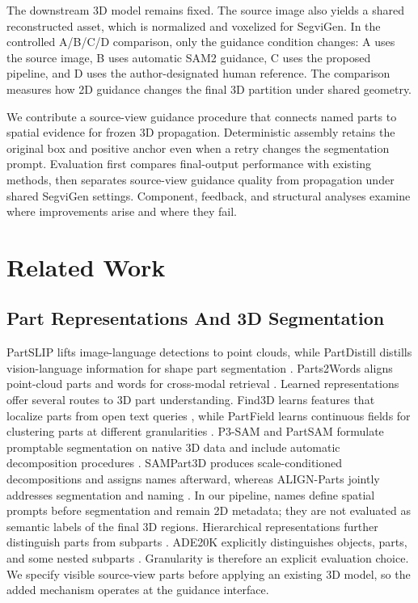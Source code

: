 \documentclass[pdflatex,iicol,sn-apa]{sn-jnl}
\begin{document}
The downstream 3D model remains fixed. The source image also yields a shared reconstructed asset, which is normalized and voxelized for SegviGen. In the controlled A/B/C/D comparison, only the guidance condition changes: A uses the source image, B uses automatic SAM2 guidance, C uses the proposed pipeline, and D uses the author-designated human reference. The comparison measures how 2D guidance changes the final 3D partition under shared geometry.

We contribute a source-view guidance procedure that connects named parts to spatial evidence for frozen 3D propagation. Deterministic assembly retains the original box and positive anchor even when a retry changes the segmentation prompt. Evaluation first compares final-output performance with existing methods, then separates source-view guidance quality from propagation under shared SegviGen settings. Component, feedback, and structural analyses examine where improvements arise and where they fail.

\section{Related Work}
\label{sec:related}

\subsection{Part Representations And 3D Segmentation}
PartSLIP lifts image-language detections to point clouds, while PartDistill distills vision-language information for shape part segmentation \citep{liu2023partslip,umam2024partdistill}. Parts2Words aligns point-cloud parts and words for cross-modal retrieval \citep{tang2023parts2words}.
Learned representations offer several routes to 3D part understanding. Find3D learns features that localize parts from open text queries \citep{ma2024find3d}, while PartField learns continuous fields for clustering parts at different granularities \citep{liu2025partfield}. P3-SAM and PartSAM formulate promptable segmentation on native 3D data and include automatic decomposition procedures \citep{ma2025p3sam,zhu2025partsam}. SAMPart3D produces scale-conditioned decompositions and assigns names afterward, whereas ALIGN-Parts jointly addresses segmentation and naming \citep{yang2024sampart3d,paul2025namethatpart}. In our pipeline, names define spatial prompts before segmentation and remain 2D metadata; they are not evaluated as semantic labels of the final 3D regions. Hierarchical representations further distinguish parts from subparts \citep{gao2025latent}. ADE20K explicitly distinguishes objects, parts, and some nested subparts \citep{zhou2019ade20k}. Granularity is therefore an explicit evaluation choice. We specify visible source-view parts before applying an existing 3D model, so the added mechanism operates at the guidance interface.
\end{document}
